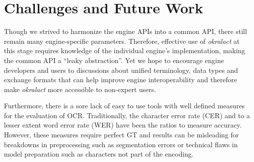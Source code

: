 \documentclass[conference]{IEEEtran}
\begin{document}



\section{Challenges and Future Work}



Though we strived to harmonize the engine APIs into a common API,
there still remain many engine-specific parameters. Therefore,
effective use of \textit{okralact} at this stage requires knowledge
of the individual engine's implementation, making the common API a
``leaky abstraction''. Yet we hope to encourage engine developers and
users to discussions about unified
terminology, data types and exchange formats that can help improve engine
interoperability and therefore make \textit{okralact} more
accessible to non-expert users.


Furthermore, there is a sore lack of easy to use tools with well
defined measures for the evaluation of OCR. Traditionally, the
character error rate (CER) and to a lesser extent word error rate
(WER) have been the ratios to measure accuracy. However, these
measures require perfect GT and results can be misleading for
breakdowns in preprocessing such as segmentation errors or
technical flaws in model preparation such as characters not part
of the encoding.

\end{document}
